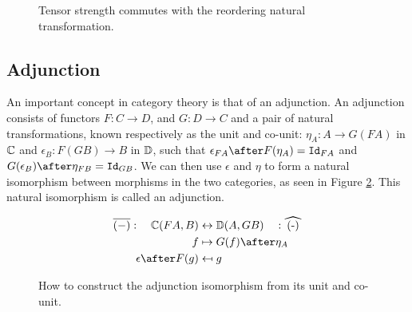 \documentclass{Report}
\begin{document}
\begin{figure}
    \centering
    \begin{framed}
        \centering
    \end{framed}
    \caption{Tensor strength commutes with the reordering natural transformation.}
    \label{TensorStrengthAlpha}
\end{figure}






\subsection{Adjunction}\label{WhatsAnAdjunction}
An important concept in category theory is that of an adjunction. An adjunction consists of functors $F: C\rightarrow D$, and  $G: D\rightarrow C$ and a pair of natural transformations, known respectively as the unit and co-unit: $\eta_A: A \rightarrow G(F A)$ in $\mathbb{C}$ and $\epsilon_B: F(G B) \rightarrow B$ in $\mathbb{D}$, such that $\epsilon_{F A}\after F(\eta_A) = \Id{F A}$ and $G(\epsilon_B)\after \eta_{F B} = \Id{G B}$. We can then use $\epsilon$ and $\eta$ to form a natural isomorphism between morphisms in the two categories, as seen in Figure \ref{Adjunction}. This natural isomorphism is called an adjunction.


\begin{figure}
    \begin{framed}
    \begin{align*}
        \bar{(-)}: \quad\C(FA, B) &\leftrightarrow \DC(A, GB)   \quad: \widehat{(-)}\\
        f & \mapsto G(f)\after\eta_A \\
        \epsilon\after F(g) & \mapsfrom g\\
    \end{align*}
    \end{framed}
    \caption{How to construct the adjunction isomorphism from its unit and co-unit.}
    \label{Adjunction}
\end{figure}
\end{document}
